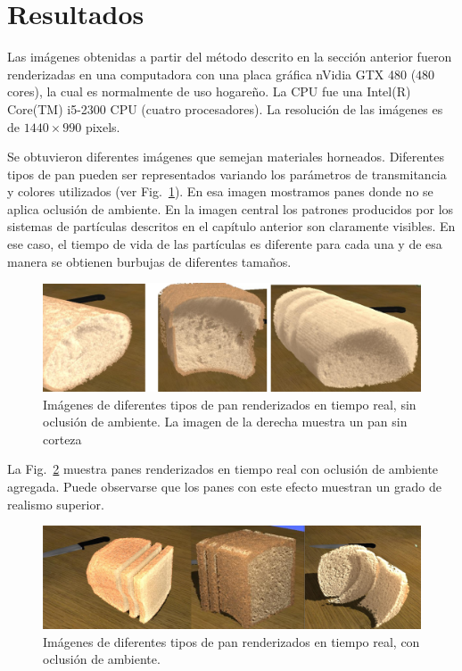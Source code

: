 \section{Resultados}
Las imágenes obtenidas a partir del método descrito en la sección anterior fueron renderizadas en una computadora con una placa gráfica nVidia GTX 480 ($480$ cores), la cual es normalmente de uso hogareño.
La CPU fue una Intel(R) Core(TM) i5-2300 CPU (cuatro procesadores).
La resolución de las imágenes es de $1440\times990$ pixels. 

Se obtuvieron diferentes imágenes que semejan materiales horneados.
Diferentes tipos de pan pueden ser representados variando los parámetros de transmitancia y colores utilizados (ver Fig.~\ref{fg:breadsnooc}).
En esa imagen mostramos panes donde no se aplica oclusión de ambiente.
En la imagen central los patrones producidos por los sistemas de partículas descritos en el capítulo anterior son claramente visibles.
En ese caso, el tiempo de vida de las partículas es diferente para cada una y de esa manera se obtienen burbujas de diferentes tamaños.

\begin{figure}[htb!]
  \centerline{\includegraphics[width=13cm]{fig5}}
  \caption[Imágenes de diferentes tipos de pan renderizados en tiempo real, sin oclusión de ambiente]{Imágenes de diferentes tipos de pan renderizados en tiempo real, sin oclusión de ambiente. La imagen de la derecha muestra un pan sin corteza}
  \label{fg:breadsnooc}
\end{figure}

La Fig.~\ref{fg:breads} muestra panes renderizados en tiempo real con oclusión de ambiente agregada.
Puede observarse que los panes con este efecto muestran un grado de realismo superior.

\begin{figure}[htb!]
  \centerline{\includegraphics[width=13cm]{breads}}
  \caption{Imágenes de diferentes tipos de pan renderizados en tiempo real, con oclusión de ambiente.}
  \label{fg:breads}
\end{figure}



